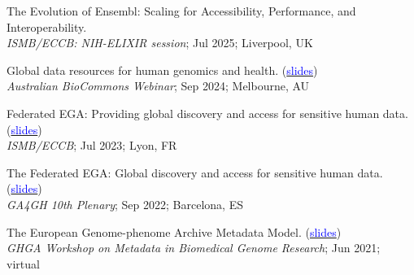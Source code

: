 \documentclass[margin,line]{res}
\begin{document}
\begin{resume}
The Evolution of Ensembl: Scaling for Accessibility, Performance, and Interoperability. \\
{\em ISMB/ECCB: NIH-ELIXIR session}; Jul 2025; Liverpool, UK

Global data resources for human genomics and health. (\href{https://zenodo.org/records/13845933}{\textcolor{blue}{slides}}) \\
{\em Australian BioCommons Webinar}; Sep 2024; Melbourne, AU

Federated EGA: Providing global discovery and access for sensitive human data. (\href{https://docs.google.com/presentation/d/1P9KMd-NAjbz1f9fgO9FVuyYTVAoYZoJAqL0wvnVNrt4/edit?usp=sharing}{\textcolor{blue}{slides}}) \\
{\em ISMB/ECCB}; Jul 2023; Lyon, FR

The Federated EGA: Global discovery and access for sensitive human data. (\href{https://docs.google.com/presentation/d/17wJu5ntPdT1Uj3kSOd_ROHY0DK7IzRwRq6Lgyvso2aw/edit?usp=sharing}{\textcolor{blue}{slides}}) \\
{\em GA4GH 10th Plenary}; Sep 2022; Barcelona, ES



The European Genome-phenome Archive Metadata Model. (\href{https://docs.google.com/presentation/d/14x9PNs3j5mNZWIHBW9k6aiJUekiLYsrbrkpaMihB4ko/edit?usp=sharing}{\textcolor{blue}{slides}}) \\
{\em GHGA Workshop on Metadata in Biomedical Genome Research}; Jun 2021; virtual





\end{resume}
\end{document}
